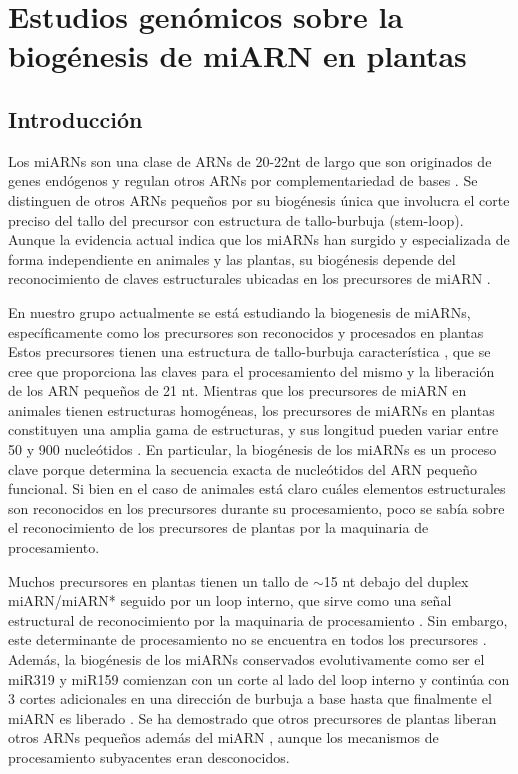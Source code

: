 
\chapter{Estudios genómicos sobre la biogénesis de miARN en plantas}

\graphicspath{{Chapter2/Figs/}}

\section{Introducción}
Los miARNs son una clase de ARNs de 20-22nt de largo que son originados de genes endógenos y regulan otros ARNs por complementariedad de bases \citep{Voinnet2009669}.
Se distinguen de otros ARNs pequeños por su biogénesis única que involucra el corte preciso del tallo del precursor con estructura de tallo-burbuja \citep{2} (stem-loop).
Aunque la evidencia actual indica que los miARNs han surgido y especializada de forma independiente en animales y las plantas, su biogénesis depende del reconocimiento de claves estructurales ubicadas en los precursores de miARN \citep{pmid21554756,citeulike:8816489,Bologna11112012}.

En nuestro grupo actualmente se está estudiando la biogenesis de miARNs, específicamente como los precursores son reconocidos y procesados en plantas \citep{Bologna2013}
Estos precursores tienen una estructura de tallo-burbuja característica \citep{2}, que se cree que proporciona las claves para el procesamiento del mismo y la liberación de los ARN pequeños de 21 nt.
Mientras que los precursores de miARN en animales tienen estructuras homogéneas, los precursores de miARNs en plantas constituyen una amplia gama de estructuras, y sus longitud pueden variar entre 50 y 900 nucleótidos \citep{Bologna2013,citeulike:8816489}.
En particular, la biogénesis de los miARNs es un proceso clave porque determina la secuencia exacta de nucleótidos del ARN pequeño funcional.
Si bien en el caso de animales está claro cuáles elementos estructurales son reconocidos en los precursores durante su procesamiento, poco se sabía sobre el reconocimiento de los precursores de plantas por la maquinaria de procesamiento.

Muchos precursores en plantas tienen un tallo de $\sim$15 nt debajo del duplex miARN/miARN* seguido por un loop interno, que sirve como una señal estructural de reconocimiento por la maquinaria de procesamiento \citep{pmid17369351,pmid16751099,Mateos2010,pmid20015654}.
Sin embargo, este determinante de procesamiento no se encuentra en todos los precursores \citep{28}.
Además, la biogénesis de los miARNs conservados evolutivamente como ser el miR319 y miR159 comienzan con un corte al lado del loop interno y continúa con 3 cortes adicionales en una dirección de burbuja a base hasta que finalmente el miARN es liberado \citep{Bologna2013,pmid19850910}.
Se ha demostrado que otros precursores de plantas liberan otros ARNs pequeños además del miARN \citep{14,31}, aunque los mecanismos de procesamiento subyacentes eran desconocidos.

